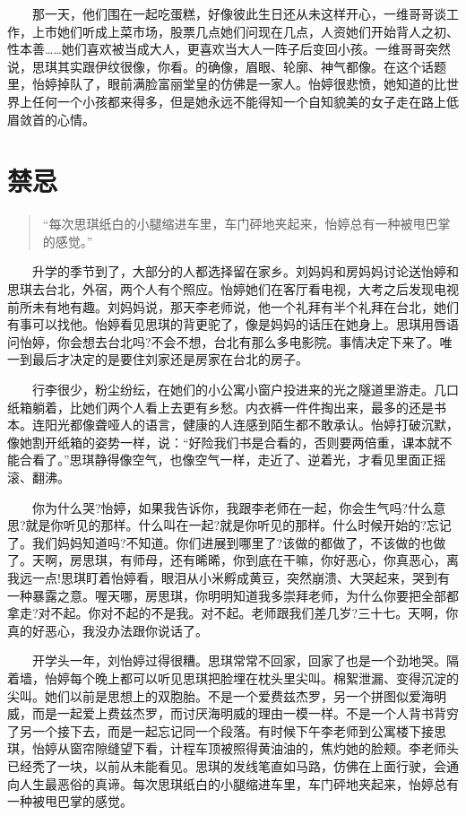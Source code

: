 \documentclass[12pt,UTF8]{ctexbook}
\begin{document}
　　那一天，他们围在一起吃蛋糕，好像彼此生日还从未这样开心，一维哥哥谈工作，上市她们听成上菜市场，股票几点她们问现在几点，人资她们开始背人之初、性本善\ldots{}\ldots{}她们喜欢被当成大人，更喜欢当大人一阵子后变回小孩。一维哥哥突然说，思琪其实跟伊纹很像，你看。的确像，眉眼、轮廓、神气都像。在这个话题里，怡婷掉队了，眼前满脸富丽堂皇的仿佛是一家人。怡婷很悲愤，她知道的比世界上任何一个小孩都来得多，但是她永远不能得知一个自知貌美的女子走在路上低眉敛首的心情。

\hypertarget{ux7981ux5fcc}{%
\section*{禁忌}\label{ux7981ux5fcc}}

\begin{quote}
\enquote{每次思琪纸白的小腿缩进车里，车门砰地夹起来，怡婷总有一种被甩巴掌的感觉。}
\end{quote}

　　升学的季节到了，大部分的人都选择留在家乡。刘妈妈和房妈妈讨论送怡婷和思琪去台北，外宿，两个人有个照应。怡婷她们在客厅看电视，大考之后发现电视前所未有地有趣。刘妈妈说，那天李老师说，他一个礼拜有半个礼拜在台北，她们有事可以找他。怡婷看见思琪的背更驼了，像是妈妈的话压在她身上。思琪用唇语问怡婷，你会想去台北吗?不会不想，台北有那么多电影院。事情决定下来了。唯一到最后才决定的是要住刘家还是房家在台北的房子。

　　行李很少，粉尘纷纭，在她们的小公寓小窗户投进来的光之隧道里游走。几口纸箱躺着，比她们两个人看上去更有乡愁。内衣裤一件件掏出来，最多的还是书本。连阳光都像聋哑人的语言，健康的人连感到陌生都不敢承认。怡婷打破沉默，像她割开纸箱的姿势一样，说：\enquote{好险我们书是合看的，否则要两倍重，课本就不能合看了。}思琪静得像空气，也像空气一样，走近了、逆着光，才看见里面正摇滚、翻沸。

　　你为什么哭?怡婷，如果我告诉你，我跟李老师在一起，你会生气吗?什么意思?就是你听见的那样。什么叫在一起?就是你听见的那样。什么时候开始的?忘记了。我们妈妈知道吗?不知道。你们进展到哪里了?该做的都做了，不该做的也做了。天啊，房思琪，有师母，还有晞晞，你到底在干嘛，你好恶心，你真恶心，离我远一点!思琪盯着怡婷看，眼泪从小米孵成黄豆，突然崩溃、大哭起来，哭到有一种暴露之意。喔天哪，房思琪，你明明知道我多崇拜老师，为什么你要把全部都拿走?对不起。你对不起的不是我。对不起。老师跟我们差几岁?三十七。天啊，你真的好恶心，我没办法跟你说话了。

　　开学头一年，刘怡婷过得很糟。思琪常常不回家，回家了也是一个劲地哭。隔着墙，怡婷每个晚上都可以听见思琪把脸埋在枕头里尖叫。棉絮泄漏、变得沉淀的尖叫。她们以前是思想上的双胞胎。不是一个爱费兹杰罗，另一个拼图似爱海明威，而是一起爱上费兹杰罗，而讨厌海明威的理由一模一样。不是一个人背书背穷了另一个接下去，而是一起忘记同一个段落。有时候下午李老师到公寓楼下接思琪，怡婷从窗帘隙缝望下看，计程车顶被照得黄油油的，焦灼她的脸颊。李老师头已经秃了一块，以前从未能看见。思琪的发线笔直如马路，仿佛在上面行驶，会通向人生最恶俗的真谛。每次思琪纸白的小腿缩进车里，车门砰地夹起来，怡婷总有一种被甩巴掌的感觉。
\end{document}
